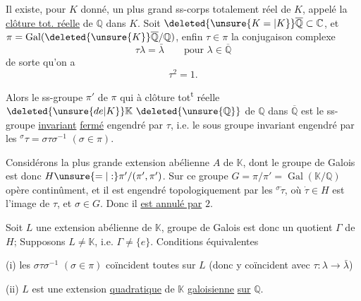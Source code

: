 Il existe, pour $K$ donné, un plus grand ss-corps
totalement réel de $K$, appelé la \uline{clôture tot. réelle} de
$\mathbb Q$ dans $K$. Soit $\deleted{\unsure{K=|K}}\overline{\mathbb Q}\subset\mathbb C$, et $\pi=\operatorname{Gal}(\deleted{\unsure{K}}\overline{\mathbb Q}/\mathbb Q)$,
enfin $\tau\in\pi$ la conjugaison complexe
\[
\tau\lambda=\bar\lambda\qquad \text{pour }\lambda\in\overline{\mathbb Q}
\]
de sorte qu'on a
\[
\tau^2=1.
\]

Alors le ss-groupe $\pi'$ de $\pi$ qui   à clôture
tot\textsuperscript{t} réelle $\deleted{\unsure{de|K}}\mathbb K\ \deleted{\unsure{\mathbb Q}}$ de $\mathbb Q$ dans $\overline{\mathbb Q}$ est  le ss-groupe
\uline{invariant} \uline{fermé} engendré par $\tau$, i.e. le sous groupe invariant
engendré par les $ {}^{\sigma}\tau=\sigma\tau\sigma^{-1}$ $(\sigma\in\pi)$.

Considérons la plus grande extension abélienne
$A$ de $\mathbb K$, dont le groupe de Galois est donc $H\unsure{=|:}\pi'/(\pi',\pi')$.  Sur
ce groupe $G=\pi/\pi'=\operatorname{Gal}(\mathbb K/\mathbb Q)$ opère continûment, et
il est engendré topologiquement par les $ {}^\sigma\dot\tau$, où $\dot\tau\in H$
est l'image de $\tau$, et $\sigma\in G$. Donc il \uline{est annulé par} $2$.

\margin{$\left[\rule{0pt}{9em}\right.$}Soit $L$ une extension abélienne de $\mathbb K$,  
groupe de Galois est donc un quotient $\Gamma$ de $H$; 
Supposons $L\ne\mathbb K$, i.e. $\Gamma\ne\{e\}$. Conditions équivalentes

(i) les $\sigma\tau\sigma^{-1}$ $(\sigma\in\pi)$ coïncident toutes sur $L$
(donc y coïncident avec $\tau:\lambda\longrightarrow\bar\lambda$)

(ii) $L$ est une extension \uline{quadratique} de $\mathbb K$ \uline{galoisienne}
\uline{sur} $\mathbb Q$.

 

